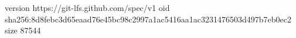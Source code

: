 version https://git-lfs.github.com/spec/v1
oid sha256:8d8febc3d65eaad76e45bc98c2997a1ac5416aa1ac3231476503d497b7eb0ec2
size 87544
